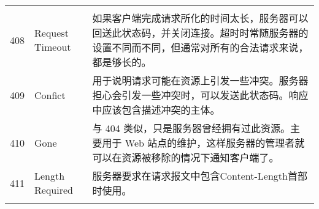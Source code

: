 \begin{longtable}[]{@{}cll@{}}
\begin{minipage}[t]{0.30\columnwidth}
\end{minipage}\tabularnewline
\begin{minipage}[t]{0.32\columnwidth}\centering\strut
408\strut
\end{minipage} & \begin{minipage}[t]{0.30\columnwidth}\raggedright\strut
Request Timeout\strut
\end{minipage} & \begin{minipage}[t]{0.30\columnwidth}\raggedright\strut
如果客户端完成请求所化的时间太长，服务器可以回送此状态码，并关闭连接。超时时常随服务器的设置不同而不同，但通常对所有的合法请求来说，都是够长的。\strut
\end{minipage}\tabularnewline
\begin{minipage}[t]{0.32\columnwidth}\centering\strut
409\strut
\end{minipage} & \begin{minipage}[t]{0.30\columnwidth}\raggedright\strut
Confict\strut
\end{minipage} & \begin{minipage}[t]{0.30\columnwidth}\raggedright\strut
用于说明请求可能在资源上引发一些冲突。服务器担心会引发一些冲突时，可以发送此状态码。响应中应该包含描述冲突的主体。\strut
\end{minipage}\tabularnewline
\begin{minipage}[t]{0.32\columnwidth}\centering\strut
410\strut
\end{minipage} & \begin{minipage}[t]{0.30\columnwidth}\raggedright\strut
Gone\strut
\end{minipage} & \begin{minipage}[t]{0.30\columnwidth}\raggedright\strut
与 404 类似，只是服务器曾经拥有过此资源。主要用于 Web
站点的维护，这样服务器的管理者就可以在资源被移除的情况下通知客户端了。\strut
\end{minipage}\tabularnewline
\begin{minipage}[t]{0.32\columnwidth}\centering\strut
411\strut
\end{minipage} & \begin{minipage}[t]{0.30\columnwidth}\raggedright\strut
Length Required\strut
\end{minipage} & \begin{minipage}[t]{0.30\columnwidth}\raggedright\strut
服务器要求在请求报文中包含Content-Length首部时使用。\strut
\end{minipage}\tabularnewline
\begin{minipage}[t]{0.32\columnwidth}\centering\strut

\end{minipage}
\end{longtable}
